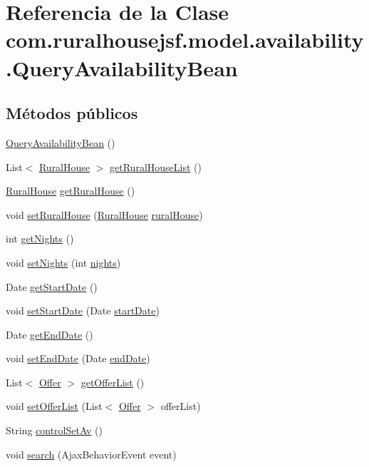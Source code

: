 \hypertarget{a00224}{}\section{Referencia de la Clase com.\+ruralhousejsf.\+model.\+availability.\+Query\+Availability\+Bean}
\label{a00224}
\subsection*{Métodos públicos}
\begin{DoxyCompactItemize}
\item 
\mbox{\hyperlink{a00224_a774769b2abae9a936441fcb0221f3cde}{Query\+Availability\+Bean}} ()
\item 
List$<$ \mbox{\hyperlink{a00188}{Rural\+House}} $>$ \mbox{\hyperlink{a00224_ac3e48b7da4e958bb59c9c22d563249e2}{get\+Rural\+House\+List}} ()
\item 
\mbox{\hyperlink{a00188}{Rural\+House}} \mbox{\hyperlink{a00224_ad4f318a7cc2f3e1fd8577693c48c086d}{get\+Rural\+House}} ()
\item 
void \mbox{\hyperlink{a00224_a0dfead1981002b06882aeeaac61b3102}{set\+Rural\+House}} (\mbox{\hyperlink{a00188}{Rural\+House}} \mbox{\hyperlink{a00224_af0ec1e1e555ba7aecce40e6b7afb35e9}{rural\+House}})
\item 
int \mbox{\hyperlink{a00224_aa1f5ab5e45a1c5ccba0e3195bad30ffd}{get\+Nights}} ()
\item 
void \mbox{\hyperlink{a00224_a7e2cb72e616081680ef73d3e0098cfb7}{set\+Nights}} (int \mbox{\hyperlink{a00224_a4b06a08eab621f9fd6bf50ea4ae78a84}{nights}})
\item 
Date \mbox{\hyperlink{a00224_ae46fcaad171bc9a64b2ab26dba2118ef}{get\+Start\+Date}} ()
\item 
void \mbox{\hyperlink{a00224_aeab72b6097d8b3c356a4d2353da24eb0}{set\+Start\+Date}} (Date \mbox{\hyperlink{a00224_a1652bdd9864dc46b9c0fb5e31282032d}{start\+Date}})
\item 
Date \mbox{\hyperlink{a00224_ad88c5dd8af5a7bfd0cccd39b0ce380df}{get\+End\+Date}} ()
\item 
void \mbox{\hyperlink{a00224_a3610ce95ad8c1adad2e4405557953d40}{set\+End\+Date}} (Date \mbox{\hyperlink{a00224_ab8a7c45b5539243a1d4f82bc5ae24305}{end\+Date}})
\item 
List$<$ \mbox{\hyperlink{a00184}{Offer}} $>$ \mbox{\hyperlink{a00224_ad9667676a26fe3df951a287607f14581}{get\+Offer\+List}} ()
\item 
void \mbox{\hyperlink{a00224_a0a1948b5e5b3b7c6028a61d194429b0d}{set\+Offer\+List}} (List$<$ \mbox{\hyperlink{a00184}{Offer}} $>$ offer\+List)
\item 
String \mbox{\hyperlink{a00224_a1a498adf03c6caab6eb80a2da7483b50}{control\+Set\+Av}} ()
\item 
void \mbox{\hyperlink{a00224_af7649b8dfb405d8faf95e00125b3efc3}{search}} (Ajax\+Behavior\+Event event)
\end{DoxyCompactItemize}
